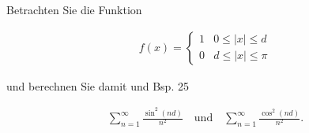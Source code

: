 
\begin{exercise}

Betrachten Sie die Funktion

\begin{align*}
    f(x)
    =
    \begin{cases}
        1 & 0 \leq |x| \leq d \\
        0 & d \leq |x| \leq \pi
    \end{cases}
\end{align*}

und berechnen Sie damit und Bsp. 25

\begin{align*}
    \sum_{n=1}^\infty
    \frac{\sin^2(n d)}{n^2}
    \quad
    \text{und}
    \quad
    \sum_{n=1}^\infty
    \frac{\cos^2(n d)}{n^2}.
\end{align*}

\end{exercise}


